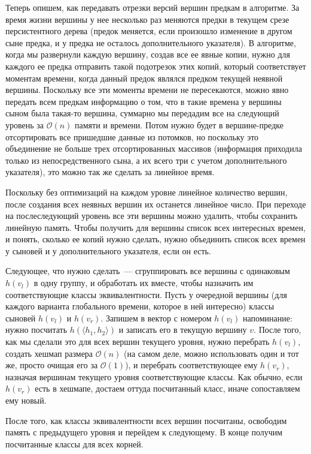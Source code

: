 Теперь опишем, как передавать отрезки версий вершин предкам в алгоритме.
За время жизни вершины у нее несколько раз меняются предки в текущем срезе персистентного дерева (предок меняется, если произошло изменение в другом сыне предка, и у предка не осталось дополнительного указателя). В алгоритме, когда мы развернули каждую вершину, создав все ее явные копии, нужно для каждого ее предка отправить такой подотрезок этих копий, который соответствует моментам времени, когда данный предок являлся предком текущей неявной вершины. Поскольку все эти моменты времени не пересекаются, можно явно передать всем предкам информацию о том, что в такие времена у вершины сыном была такая-то вершина, суммарно мы передадим все на следующий уровень за $\mathcal{O}(n)$ памяти и времени. Потом нужно будет в вершине-предке отсортировать все пришедшие данные из потомков, но поскольку это объединение не больше трех отсортированных массивов (информация приходила только из непосредственного сына, а их всего три с учетом дополнительного указателя), это можно так же сделать за линейное время.

Поскольку без оптимизаций на каждом уровне линейное количество вершин, после создания всех неявных вершин их останется линейное число. При переходе на послеследующий уровень все эти вершины можно удалить, чтобы сохранить линейную память.
Чтобы получить для вершины список всех интересных времен, и понять, сколько ее копий нужно сделать, нужно объединить список всех времен у сыновей и у дополнительного указателя, если он есть. 

Следующее, что нужно сделать~--- сгруппировать все вершины с одинаковым $h(v_l)$ в одну группу, и обработать их вместе, чтобы назначить им соответствующие классы эквивалентности. Пусть у очередной вершины (для каждого варианта глобального времени, которое в ней интересно) классы сыновей $h(v_l)$ и $h(v_r)$. Запишем в вектор с номером $h(v_l)$ напоминание: нужно посчитать $h(\langle h_1, h_2 \rangle)$ и записать его в текущую вершину $v$. После того, как мы сделали это для всех вершин текущего уровня, нужно перебрать $h(v_l)$, создать хешмап размера $\mathcal{O}(n)$ (на самом деле, можно использовать один и тот же, просто очищая его за $\mathcal{O}(1)$), и перебрать соответствующее ему $h(v_r)$, назначая вершинам текущего уровня соответствующие классы. Как обычно, если $h(v_r)$ есть в хешмапе, достаем оттуда посчитанный класс, иначе сопоставляем ему новый. 

После того, как классы эквивалентности всех вершин посчитаны, освободим память с предыдущего уровня и перейдем к следующему. В конце получим посчитанные классы для всех корней.

